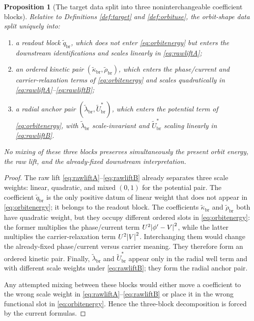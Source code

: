 \documentclass[11pt]{article}
\newcommand{\RespShapeReadout}{\widetilde q_{\mathrm{br}}}
\newcommand{\RespShapeCov}{\widetilde\kappa_{\mathrm{br}}}
\newcommand{\RespShapeRelax}{\widetilde\rho_{\mathrm{br}}}
\newcommand{\RespShapeWell}{\widetilde\lambda_{\mathrm{br}}}
\newcommand{\RespShapeEq}{\widetilde U_{\mathrm{br}}^{\ast}}
\newtheorem{proposition}{Proposition}
\begin{document}
\begin{proposition}[The target data split into three noninterchangeable coefficient blocks]
\label{prop:blocks}
Relative to Definitions \ref{def:target} and \ref{def:orbituse}, the orbit-shape data split uniquely into:
\begin{enumerate}
    \item a \emph{readout block} \(\RespShapeReadout\), which does not enter \eqref{eq:orbitenergy} but enters the downstream identifications and scales linearly in \eqref{eq:rawliftA};
    \item an \emph{ordered kinetic pair} \((\RespShapeCov,\RespShapeRelax)\), which enters the phase/current and carrier-relaxation terms of \eqref{eq:orbitenergy} and scales quadratically in \eqref{eq:rawliftA}--\eqref{eq:rawliftB};
    \item a \emph{radial anchor pair} \((\RespShapeWell,\RespShapeEq)\), which enters the potential term of \eqref{eq:orbitenergy}, with \(\RespShapeWell\) scale-invariant and \(\RespShapeEq\) scaling linearly in \eqref{eq:rawliftB}.
\end{enumerate}
No mixing of these three blocks preserves simultaneously the present orbit energy, the raw lift, and the already-fixed downstream interpretation.
\end{proposition}

\begin{proof}
The raw lift \eqref{eq:rawliftA}--\eqref{eq:rawliftB} already separates three scale weights: linear, quadratic, and mixed \((0,1)\) for the potential pair. The coefficient \(\RespShapeReadout\) is the only positive datum of linear weight that does not appear in \eqref{eq:orbitenergy}; it belongs to the readout block. The coefficients \(\RespShapeCov\) and \(\RespShapeRelax\) both have quadratic weight, but they occupy different ordered slots in \eqref{eq:orbitenergy}: the former multiplies the phase/current term \(U^2\abs{\phi'-V}^2\), while the latter multiplies the carrier-relaxation term \(U^2\abs{V}^2\). Interchanging them would change the already-fixed phase/current versus carrier meaning. They therefore form an ordered kinetic pair. Finally, \(\RespShapeWell\) and \(\RespShapeEq\) appear only in the radial well term and with different scale weights under \eqref{eq:rawliftB}; they form the radial anchor pair.

Any attempted mixing between these blocks would either move a coefficient to the wrong scale weight in \eqref{eq:rawliftA}--\eqref{eq:rawliftB} or place it in the wrong functional slot in \eqref{eq:orbitenergy}. Hence the three-block decomposition is forced by the current formulas.
\end{proof}
\end{document}
